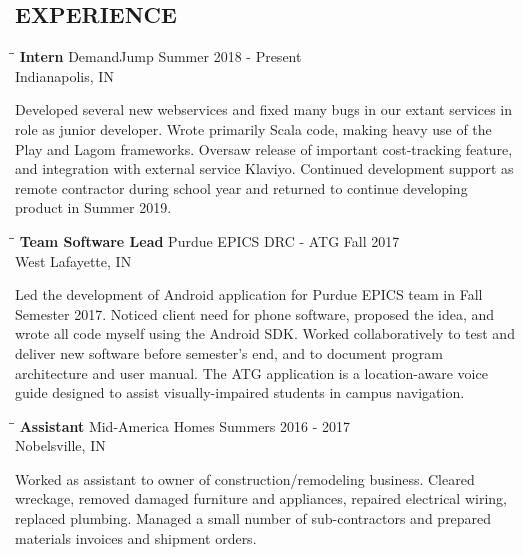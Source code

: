 \documentclass[10pt]{res}
\begin{document}
\begin{resume}
\vspace{-20pt}\section{EXPERIENCE}
   \vspace{-0.1in}	
	\begin{tabbing}
   \hspace{2.3in}\= \hspace{2.6in}\= \kill %
    {\bf Intern} \>DemandJump \>Summer 2018 - Present \\
                             \>Indianapolis, IN
   \end{tabbing}\vspace{-20pt}      %
  Developed several new webservices and fixed many bugs in our extant services in role as junior
  developer. Wrote primarily Scala code, making heavy use of the Play and Lagom frameworks. Oversaw release of important cost-tracking feature, and integration with external service
  Klaviyo. Continued development support as remote contractor during school year and returned to
  continue developing product in Summer 2019.
  \vspace{-10pt}\begin{tabbing}
   \hspace{2.3in}\= \hspace{2.6in}\= \kill %
    {\bf Team Software Lead} \>Purdue EPICS DRC - ATG \>Fall 2017 \\
                             \>West Lafayette, IN
   \end{tabbing}\vspace{-20pt}      %
	Led the development of Android application for Purdue EPICS team in Fall Semester 2017. Noticed client need for phone software, proposed the idea, and wrote all code myself
	using the Android SDK. Worked collaboratively to test and deliver new software before semester's end, and to document program architecture and user manual. The ATG
	application is a location-aware voice guide designed to assist visually-impaired students in campus navigation.
	\vspace{-10pt}\begin{tabbing}
   \hspace{2.3in}\= \hspace{2.6in}\= \kill %
    {\bf Assistant} \>Mid-America Homes \>Summers 2016 - 2017 \\
                             \>Nobelsville, IN
   \end{tabbing}\vspace{-20pt}      %
	Worked as assistant to owner of construction/remodeling business. 
	Cleared wreckage, removed damaged furniture and appliances, repaired electrical wiring, replaced plumbing. 
	Managed a small number of sub-contractors and prepared materials invoices and shipment orders. 
	

\end{resume}
\end{document}
